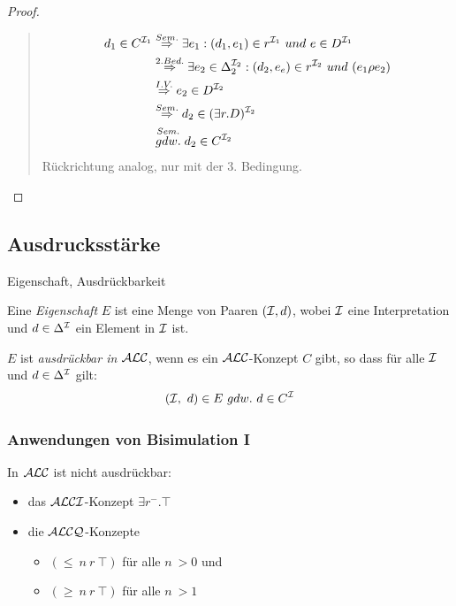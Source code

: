 \begin{proof}
\begin{quote}
\begin{equation}
\begin{split}
d_{1} \in C^{\mathcal{I}_{1}} &\stackrel{Sem.}{\Rightarrow} \exists e_1 : (d_1,e_1) \in r^{\mathcal{I}_1}\ und\ e \in D^{\mathcal{I}_1}\\
&\stackrel{2.Bed.}{\Rightarrow} \exists e_2 \in \Delta_2^{\mathcal{I}_2}: (d_2,e_e) \in r^{\mathcal{I}_2}\ und\ (e_1 \rho e_2) \\
&\stackrel{I.V.}{\Rightarrow} e_2 \in D^{\mathcal{I}_2} \\
&\stackrel{Sem.}{\Rightarrow} d_{2} \in (\exists r.D)^{\mathcal{I}_2} \\
&\stackrel{Sem.}{gdw.} d_2 \in C^{\mathcal{I}_{2}}
\end{split}
\end{equation}
Rückrichtung analog, nur mit der 3. Bedingung.
\end{quote}
\end{proof}

\subsection{Ausdrucksstärke}\label{ausdrucksstuxe4rke}

\begin{definition}{Eigenschaft, Ausdrückbarkeit}

Eine \emph{Eigenschaft} $E$ ist eine Menge von Paaren $(\mathcal{I},d)$, wobei
$\mathcal{I}$ eine Interpretation und $d \in \Delta^{\mathcal{I}}$ ein Element in $\mathcal{I}$ ist.

$E$ ist \emph{ausdrückbar in $\mathcal{A}\mathcal{L}\mathcal{C}$}, wenn es ein $\mathcal{A}\mathcal{L}\mathcal{C}$-Konzept $C$
gibt, so dass für alle $\mathcal{I}$ und $d \in \Delta^{\mathcal{I}}$ gilt:
$$\left( \mathcal{I},\ d \right) \in E\ gdw.\ d \in C^{\mathcal{I}}$$
\end{definition}

\subsubsection{Anwendungen von Bisimulation I}\label{theorem-3.4}

\begin{theorem}
In $\mathcal{A}\mathcal{L}\mathcal{C}$ ist nicht ausdrückbar: 
\begin{itemize}
\item das $\mathcal{A}\mathcal{L}\mathcal{C}\mathcal{I}$-Konzept $\exists r^{-}.\top$ 
\item die $\mathcal{A}\mathcal{L}\mathcal{C}\mathcal{Q}$-Konzepte
\begin{itemize}
  \item $(\leq\ n\ r\ \top)$ für alle $n\ > 0$ und
  \item $(\geq\ n\ r\ \top)$ für alle $n\ > 1$
\end{itemize}
\end{itemize}
\end{theorem}


